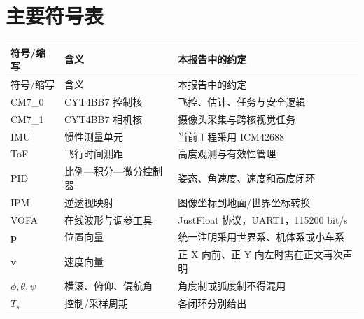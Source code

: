 \chapter*{主要符号表}

\begin{longtable}{>{\centering\arraybackslash}p{2.6cm}p{5.0cm}p{5.1cm}}
\toprule
符号/缩写 & 含义 & 本报告中的约定 \\
\midrule
\endfirsthead
\toprule
符号/缩写 & 含义 & 本报告中的约定 \\
\midrule
\endhead
CM7\_0 & CYT4BB7 控制核 & 飞控、估计、任务与安全逻辑 \\
CM7\_1 & CYT4BB7 相机核 & 摄像头采集与跨核视觉任务 \\
IMU & 惯性测量单元 & 当前工程采用 ICM42688 \\
ToF & 飞行时间测距 & 高度观测与有效性管理 \\
PID & 比例—积分—微分控制器 & 姿态、角速度、速度和高度闭环 \\
IPM & 逆透视映射 & 图像坐标到地面/世界坐标转换 \\
VOFA & 在线波形与调参工具 & JustFloat 协议，UART1，115200 bit/s \\
$\bm{p}$ & 位置向量 & 统一注明采用世界系、机体系或小车系 \\
$\bm{v}$ & 速度向量 & 正 X 向前、正 Y 向左时需在正文再次声明 \\
$\phi,\theta,\psi$ & 横滚、俯仰、偏航角 & 角度制或弧度制不得混用 \\
$T_s$ & 控制/采样周期 & 各闭环分别给出 \\
\bottomrule
\end{longtable}

